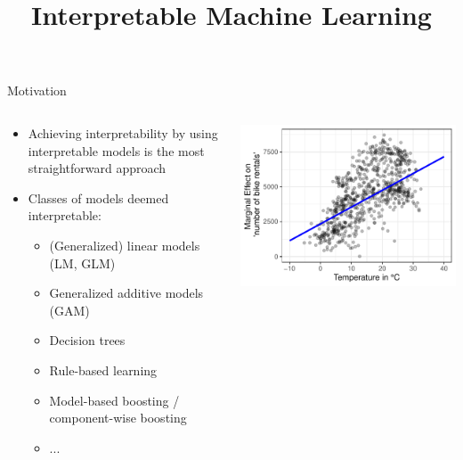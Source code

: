\documentclass[11pt,compress,t,notes=noshow, aspectratio=169, xcolor=table]{beamer}
\title{Interpretable Machine Learning}
\date{}
\begin{document}
 

\newcommand{\titlefigure}{figure/whitebox}
\newcommand{\learninggoals}{
\item Why should we use interpretable models?
\item Advantages and disadvantages of interpretable models
}


\begin{frame}{Motivation}
\begin{columns}[T, totalwidth = \linewidth]
    \begin{column}{0.5\textwidth}
    \begin{itemize}
       \item Achieving interpretability by using interpretable models is the most straightforward approach
        \bigskip
        \item Classes of models deemed interpretable:
        \begin{itemize}
            \item (Generalized) linear models (LM, GLM)
            \item Generalized additive models (GAM)
            \item Decision trees
            \item Rule-based learning
            \item Model-based boosting / component-wise boosting
            \item ...
        \end{itemize}
    \end{itemize}
    \end{column}
    \begin{column}{0.45\textwidth}  %
  \includegraphics[width = \textwidth]{figure/main_effect_lm_temp.pdf}

\end{column}
\end{columns}
\end{frame}
\end{document}
